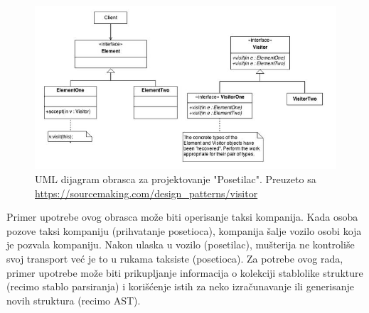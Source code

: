 \begin{figure}[h!]
    \centering
    \includegraphics[scale=0.8]{images/visitor.jpg}
    \caption{UML dijagram obrasca za projektovanje "Posetilac". Preuzeto sa \url{https://sourcemaking.com/design_patterns/visitor}} 
    \label{fig:UMLVisitor}
\end{figure}

Primer upotrebe ovog obrasca može biti operisanje taksi kompanija. Kada osoba pozove taksi kompaniju (prihvatanje posetioca), kompanija šalje vozilo osobi koja je pozvala kompaniju. Nakon ulaska u vozilo (posetilac), mušterija ne kontroliše svoj transport već je to u rukama taksiste (posetioca). Za potrebe ovog rada, primer upotrebe može biti prikupljanje informacija o kolekciji stablolike strukture (recimo stablo parsiranja) i korišćenje istih za neko izračunavanje ili generisanje novih struktura (recimo AST). 
